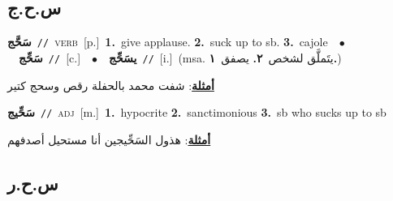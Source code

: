 \documentclass[10pt,a4paper,twoside]{article} %
\begin{document}
\begin{multicols}{2}
\vspace{-3mm}
\subsection*{\color{blue}\foreignlanguage{arabic}{س.ح.ج}\color{blue}{}} 

{\setlength\topsep{0pt}\textbf{\foreignlanguage{arabic}{سَحَّج}}\ {\color{gray}\texttt{//}\color{black}}\ \textsc{verb}\ [p.]\ \textbf{1.}~give applause.  \textbf{2.}~suck up to sb.  \textbf{3.}~cajole\ \ $\bullet$\ \ \setlength\topsep{0pt}\textbf{\foreignlanguage{arabic}{سَحِّج}}\ {\color{gray}\texttt{//}\color{black}}\ [c.]\ \ $\bullet$\ \ \setlength\topsep{0pt}\textbf{\foreignlanguage{arabic}{يسَحِّج}}\ {\color{gray}\texttt{//}\color{black}}\ [i.]\ \color{gray}(msa. \foreignlanguage{arabic}{يتَملَّق لشخص}~\foreignlanguage{arabic}{\textbf{٢.}}  \foreignlanguage{arabic}{يصفق}~\foreignlanguage{arabic}{\textbf{١.}})\color{black}\  \begin{flushright}\color{gray}\foreignlanguage{arabic}{\textbf{\underline{\foreignlanguage{arabic}{أمثلة}}}: شفت محمد بالحفلة رقص وسحج كتير}\end{flushright}\color{black}} \vspace{2mm}

{\setlength\topsep{0pt}\textbf{\foreignlanguage{arabic}{سَحِّيج}}\ {\color{gray}\texttt{//}\color{black}}\ \textsc{adj}\ [m.]\ \textbf{1.}~hypocrite  \textbf{2.}~sanctimonious  \textbf{3.}~sb who sucks up to sb\  \begin{flushright}\color{gray}\foreignlanguage{arabic}{\textbf{\underline{\foreignlanguage{arabic}{أمثلة}}}: هذول السَحِّيجين أنا مستحيل أصدفهم}\end{flushright}\color{black}} \vspace{2mm}

\vspace{-3mm}
\subsection*{\color{blue}\foreignlanguage{arabic}{س.ح.ر}\color{blue}{}} 


\end{multicols}
\end{document}
